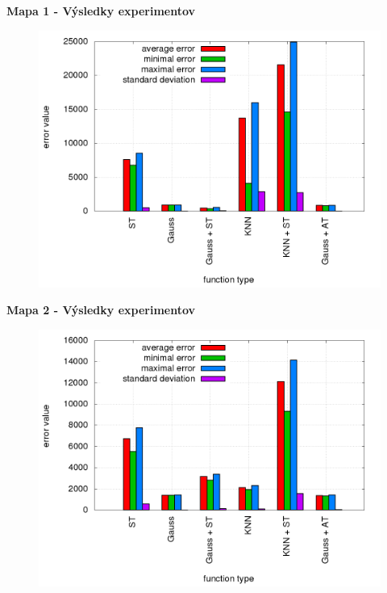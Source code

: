 \documentclass[xcolor=dvipsnames]{beamer}
\begin{document}
\begin{frame}{\bf Mapa 1 - Výsledky experimentov}

\begin{figure}[!htb]
\centering
\includegraphics[scale=.36]{../../results_q_learning/map_0/trials_average_results.png}
\end{figure}

\end{frame}

\begin{frame}{\bf Mapa 2 - Výsledky experimentov}

\begin{figure}[!htb]
\centering
\includegraphics[scale=.36]{../../results_q_learning/map_2/trials_average_results.png}
\end{figure}

\end{frame}
\end{document}
